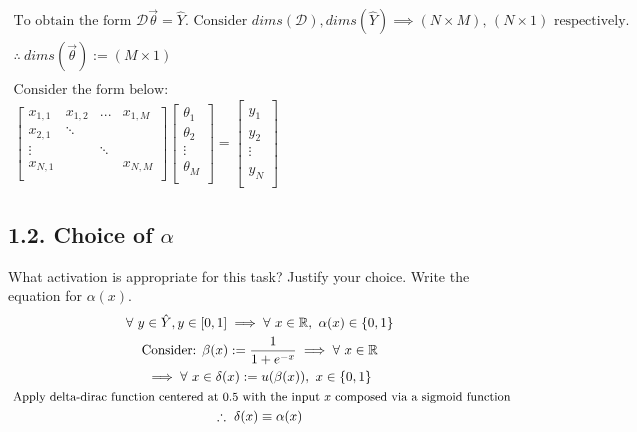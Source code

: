\documentclass[11pt]{article}
\theoremstyle{plain}
\begin{document}
\[
	\begin{gathered}
		\text{To obtain the form $\mathcal{D}\vec{\theta} = \hat{Y}$. Consider $dims(\mathcal{D}), dims(\hat{Y}) \implies (N \times M)$, $(N \times 1)$ respectively.} \\
		\therefore ~dims(\vec{\theta}) := (M \times 1) \\ \\
		\text{Consider the form below: } \\
		\begin{bmatrix}
			x_{1,1} & x_{1,2} & ...    & x_{1,M} \\
			x_{2,1} & \ddots                     \\
			\vdots  &         & \ddots           \\
			x_{N,1} &         &        & x_{N,M} \\
		\end{bmatrix}
		\begin{bmatrix}
			\theta_1 \\
			\theta_2 \\
			\vdots   \\
			\theta_M \\
		\end{bmatrix}
		=
		\begin{bmatrix}
			\hat{y}_1 \\
			\hat{y}_2 \\
			\vdots    \\
			\hat{y}_N \\
		\end{bmatrix}
	\end{gathered}
\]
\subsection*{1.2. Choice of $\alpha$ }
What activation is appropriate for this task? Justify your choice. Write the equation for  $\alpha(x)$.
\[
	\begin{gathered}
		\forall ~y \in \hat{Y}, y \in [0,1] \implies \forall ~x \in \mathbb{R}, ~\alpha(x) \in \{ 0,1 \} \\
		\text{Consider: } \beta(x) := \frac{1}{1+e^{-x}} \implies \forall ~x \in \mathbb{R}  \\
		\implies \forall ~x \in \delta(x) := u(\beta(x)), ~x \in \{ 0,1 \} \\
		\small{\text{ Apply delta-dirac function centered at $0.5$ with the input $x$ composed via a sigmoid function}} \\
		\therefore ~\delta(x) \equiv \alpha(x)
	\end{gathered}
\]
\end{document}
